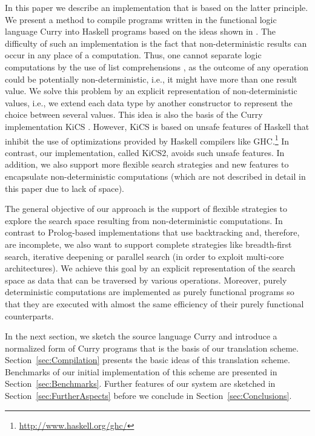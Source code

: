 \documentclass{llncs}
\begin{document}
In this paper we describe an implementation that is based
on the latter principle. We present a method to compile
programs written in the functional logic language Curry \cite{Hanus06Curry}
into Haskell programs based on the ideas shown
in \cite{BrasselFischer08IFL}.
The difficulty of such an implementation is the fact
that non-deterministic results can occur in any place of a
computation. Thus, one cannot separate logic computations
by the use of list comprehensions \cite{Wadler85},
as the outcome of any operation could be potentially non-deterministic,
i.e., it might have more than one result value.
We solve this problem by an explicit representation of
non-deterministic values, i.e., we extend each data type by
another constructor to represent the choice between several values.
This idea is also the basis of the Curry implementation KiCS
\cite{BrasselHuch07,BrasselHuch09}.
However, KiCS is based on unsafe features of Haskell
that inhibit the use of optimizations provided by Haskell compilers
like GHC.\footnote{\url{http://www.haskell.org/ghc/}}
In contrast, our implementation, called KiCS2, avoids such unsafe features.
In addition, we also support more flexible search strategies
and new features to encapsulate non-deterministic computations
(which are not described in detail in this paper due to lack of space).

The general objective of our approach is the support
of flexible strategies to explore the search space
resulting from non-deterministic computations.
In contrast to Prolog-based implementations
that use backtracking and, therefore, are incomplete,
we also want to support complete strategies like breadth-first search,
iterative deepening or parallel search (in order to exploit
multi-core architectures). We achieve this goal by an
explicit representation of the search space as data
that can be traversed by various operations.
Moreover, purely deterministic computations
are implemented as purely functional programs so that
they are executed with almost the same efficiency
of their purely functional counterparts.

In the next section, we sketch the source language Curry
and introduce a normalized form of Curry programs that is the
basis of our translation scheme.
Section~\ref{sec:Compilation} presents the basic ideas
of this translation scheme.
Benchmarks of our initial implementation of this scheme
are presented in Section~\ref{sec:Benchmarks}.
Further features of our system are sketched in
Section~\ref{sec:FurtherAspects}
before we conclude in Section~\ref{sec:Conclusions}.
\end{document}
